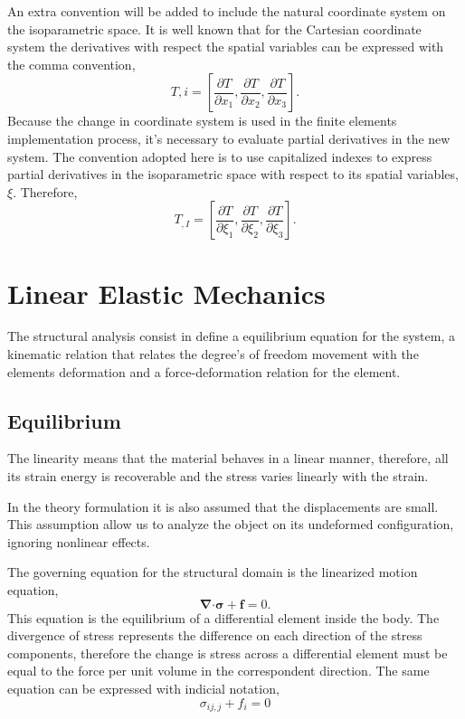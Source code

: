 \documentclass[11pt, a4paper]{article}
\numberwithin{equation}{section}
\begin{document}
An extra convention will be added to include the natural coordinate system on the isoparametric space. It is well known that for the Cartesian coordinate system the derivatives with respect the spatial variables can be expressed with the comma convention,
\begin{equation}
T{,i} = \left[ \dfrac{\partial T}{\partial x_1}, \dfrac{\partial T}{\partial x_2}, \dfrac{\partial T}{\partial x_3} \right].
\end{equation}
Because the change in coordinate system is used in the finite elements implementation process, it's necessary to evaluate partial derivatives in the new system. The convention adopted here is to use capitalized indexes to express partial derivatives in the isoparametric space with respect to its spatial variables, $\xi$. Therefore,
\begin{equation}
T_{,I} = \left[ \dfrac{\partial T}{\partial \xi_1}, \dfrac{\partial T}{\partial \xi_2}, \dfrac{\partial T}{\partial \xi_3} \right].
\end{equation}

\section{Linear Elastic Mechanics}

The structural analysis consist in define a equilibrium equation for the system, a kinematic relation that relates the degree's of freedom movement with the elements deformation and a force-deformation relation for the element.

\subsection{Equilibrium}

The linearity means that the material behaves in a linear manner, therefore, all its strain energy is recoverable and the stress varies linearly with the strain.

In the theory formulation it is also assumed that the displacements are small. This assumption allow us to analyze the object on its undeformed configuration, ignoring nonlinear effects.

The governing equation for the structural domain is the linearized motion equation,
\begin{equation}
\boldsymbol \nabla \boldsymbol \cdot \boldsymbol \sigma + \mathbf{f}= 0.
\end{equation}
This equation is the equilibrium of a differential element inside the body. The divergence of stress represents the difference on each direction of the stress components, therefore the change is stress across a differential element must be equal to the force per unit volume in the correspondent direction. The same equation can be expressed with indicial notation,
\begin{equation}
\sigma_{ij,j} + f_i = 0
\end{equation}
\end{document}
